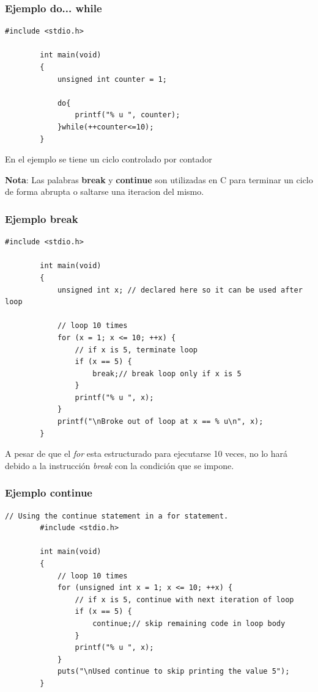 \documentclass[10.5pt,scale=1.0,t,aspectratio=169,hyperref={pdfpagelabels=false}]{beamer}
\begin{document}
\begin{frame}[fragile]
	\frametitle{Ejemplo do... while}
	\begin{lstlisting}[style=CStyle]
		#include <stdio.h>
		
		int main(void)
		{
			unsigned int counter = 1;
			
			do{
				printf("% u ", counter);
			}while(++counter<=10);
		}
	\end{lstlisting}
	En el ejemplo se tiene un ciclo controlado por contador
	
	\textbf{Nota}: Las palabras \textbf{break} y \textbf{continue} son utilizadas en C para terminar un ciclo de forma abrupta o saltarse una iteracion del mismo. 
\end{frame}

\begin{frame}[fragile]
	\frametitle{Ejemplo break}
	\begin{lstlisting}[style=CStyle]
		#include <stdio.h>
		
		int main(void)
		{
			unsigned int x; // declared here so it can be used after loop
			
			// loop 10 times
			for (x = 1; x <= 10; ++x) {
				// if x is 5, terminate loop
				if (x == 5) {
					break;// break loop only if x is 5
				}
				printf("% u ", x);
			}
			printf("\nBroke out of loop at x == % u\n", x);
		}
	\end{lstlisting}
	A pesar de que el \textit{for} esta estructurado para ejecutarse 10 veces, no lo hará debido a la instrucción \textit{break} con la condición que se impone.
\end{frame}

\begin{frame}[fragile]
	\frametitle{Ejemplo continue}
	\begin{lstlisting}[style=CStyle]
		// Using the continue statement in a for statement.
		#include <stdio.h>
		
		int main(void)
		{
			// loop 10 times
			for (unsigned int x = 1; x <= 10; ++x) {
				// if x is 5, continue with next iteration of loop
				if (x == 5) {
					continue;// skip remaining code in loop body
				}
				printf("% u ", x);
			}
			puts("\nUsed continue to skip printing the value 5");
		}
	\end{lstlisting}
\end{frame}
\end{document}
